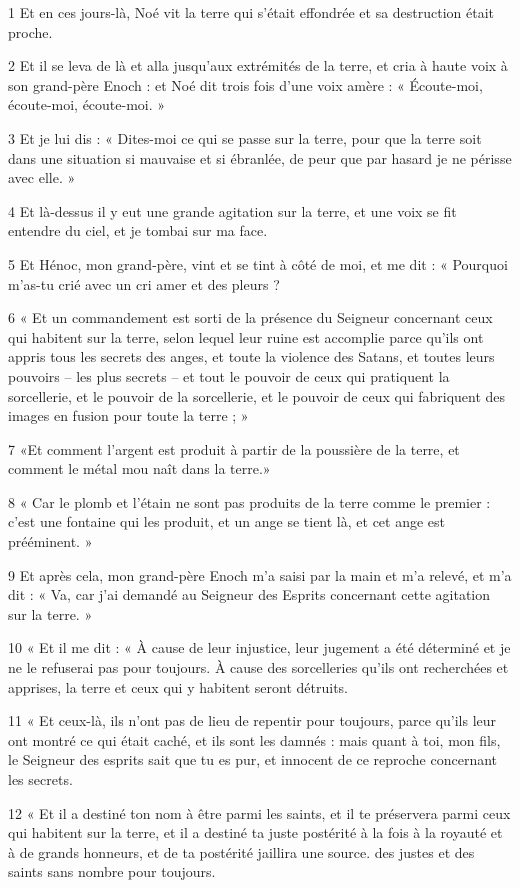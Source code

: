 \par 1 Et en ces jours-là, Noé vit la terre qui s'était effondrée et sa destruction était proche.
\par 2 Et il se leva de là et alla jusqu'aux extrémités de la terre, et cria à haute voix à son grand-père Enoch : et Noé dit trois fois d'une voix amère : « Écoute-moi, écoute-moi, écoute-moi. »
\par 3 Et je lui dis : « Dites-moi ce qui se passe sur la terre, pour que la terre soit dans une situation si mauvaise et si ébranlée, de peur que par hasard je ne périsse avec elle. »
\par 4 Et là-dessus il y eut une grande agitation sur la terre, et une voix se fit entendre du ciel, et je tombai sur ma face.
\par 5 Et Hénoc, mon grand-père, vint et se tint à côté de moi, et me dit : « Pourquoi m'as-tu crié avec un cri amer et des pleurs ?
\par 6 « Et un commandement est sorti de la présence du Seigneur concernant ceux qui habitent sur la terre, selon lequel leur ruine est accomplie parce qu'ils ont appris tous les secrets des anges, et toute la violence des Satans, et toutes leurs pouvoirs – les plus secrets – et tout le pouvoir de ceux qui pratiquent la sorcellerie, et le pouvoir de la sorcellerie, et le pouvoir de ceux qui fabriquent des images en fusion pour toute la terre ; »
\par 7 «Et comment l'argent est produit à partir de la poussière de la terre, et comment le métal mou naît dans la terre.»
\par 8 « Car le plomb et l'étain ne sont pas produits de la terre comme le premier : c'est une fontaine qui les produit, et un ange se tient là, et cet ange est prééminent. »
\par 9 Et après cela, mon grand-père Enoch m'a saisi par la main et m'a relevé, et m'a dit : « Va, car j'ai demandé au Seigneur des Esprits concernant cette agitation sur la terre. »
\par 10 « Et il me dit : « À cause de leur injustice, leur jugement a été déterminé et je ne le refuserai pas pour toujours. À cause des sorcelleries qu’ils ont recherchées et apprises, la terre et ceux qui y habitent seront détruits.
\par 11 « Et ceux-là, ils n'ont pas de lieu de repentir pour toujours, parce qu'ils leur ont montré ce qui était caché, et ils sont les damnés : mais quant à toi, mon fils, le Seigneur des esprits sait que tu es pur, et innocent de ce reproche concernant les secrets.
\par 12 « Et il a destiné ton nom à être parmi les saints, et il te préservera parmi ceux qui habitent sur la terre, et il a destiné ta juste postérité à la fois à la royauté et à de grands honneurs, et de ta postérité jaillira une source. des justes et des saints sans nombre pour toujours.

